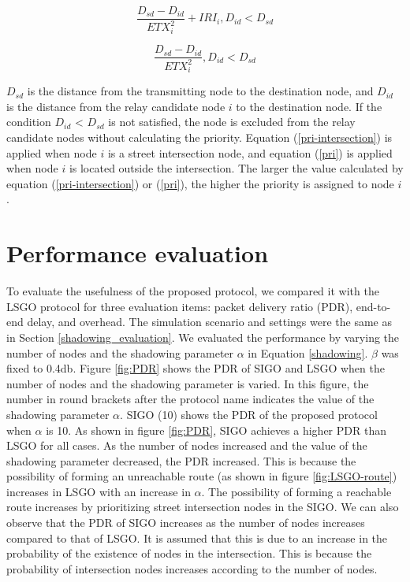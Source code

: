 \documentclass[conference]{IEEEtran}
\begin{document}
\begin{equation}
\label{pri-intersection}
\frac{D_{sd} - D_{id}}{ETX_{i}^{2}} + IRI_i,  D_{id} < D_{sd}
\end{equation}

\begin{equation}
\label{pri}
\frac{D_{sd} - D_{id}}{ETX_{i}^{2}} ,   D_{id} < D_{sd}
\end{equation}

$D_{sd}$ is the distance from the transmitting node to the destination node, and $D_{id}$ is the distance from the relay candidate node $i$ to the destination node. If the condition $D_{id}$ < $D_{sd}$ is not satisfied, the node is excluded from the relay candidate nodes without calculating the priority. 
Equation (\ref{pri-intersection}) is applied when node $i$ is a street intersection node, and equation (\ref{pri}) is applied when node $i$ is located outside the intersection. 
The larger the value calculated by equation (\ref{pri-intersection}) or (\ref{pri}), the higher the priority is assigned to node $i$. 


\section{Performance evaluation}
\label{evaluation}
To evaluate the usefulness of the proposed protocol, we compared it with the LSGO protocol for three evaluation items: packet delivery ratio (PDR), end-to-end delay, and overhead.
The simulation scenario and settings were the same as in Section \ref{shadowing_evaluation}. 
We evaluated the performance by varying the number of nodes and the shadowing parameter $\alpha$ in Equation \ref{shadowing}. 
$\beta$ was fixed to 0.4db.
Figure \ref{fig:PDR} shows the PDR of SIGO and LSGO when the number of nodes and the shadowing parameter is varied. 
In this figure, the number in round brackets after the protocol name indicates the value of the shadowing parameter $\alpha$. SIGO (10) shows the PDR of the proposed protocol when $\alpha$ is 10.
As shown in figure \ref{fig:PDR}, SIGO achieves a higher PDR than LSGO for all cases. 
As the number of nodes increased and the value of the shadowing parameter decreased, the PDR increased. This is because the possibility of forming an unreachable route (as shown in figure \ref{fig:LSGO-route}) increases in LSGO with an increase in $\alpha$. The possibility of forming a reachable route increases by prioritizing street intersection nodes in the SIGO.
We can also observe that the PDR of SIGO increases as the number of nodes increases compared to that of LSGO. It is assumed that this is due to an increase in the probability of the existence of nodes in the intersection. 
This  is because the probability of intersection nodes increases according to the number of nodes.
\end{document}
